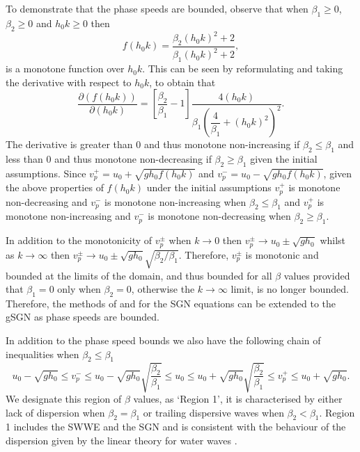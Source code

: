 \documentclass[10pt]{elsarticle}
\begin{document}
To demonstrate that the phase speeds are bounded, observe that when $\beta_1 \ge 0$, $\beta_2 \ge 0$ and $h_0 k \ge 0$ then
\begin{equation*}
f(h_0k) = \dfrac{\beta_2 \left(h_0 k\right)^2 + 2}{\beta_1 \left(h_0 k\right)^2 + 2},
\end{equation*}
is a monotone function over $h_0 k$. This can be seen by reformulating and taking the derivative with respect to $h_0 k$, to obtain that 
\begin{equation*}
 \dfrac{\partial \left(f(h_0k)\right)}{\partial \left(h_0 k\right)} = \left[\dfrac{\beta_2}{\beta_1} - 1\right] \dfrac{4\left(h_0 k\right)}{\beta_1\left( \dfrac{4}{\beta_1} + \left(h_0 k\right)^2\right)^2}.
\end{equation*}
The derivative is greater than $0$ and thus monotone non-increasing if $\beta_2 \le \beta_1$ and less than $0$ and thus monotone non-decreasing if $\beta_2 \ge  \beta_1$  given the initial assumptions. Since $v^+_p = u_0 + \sqrt{gh_0 f(h_0 k)} $ and $v^-_p = u_0 - \sqrt{gh_0 f(h_0 k)}$, given the above properties of $f(h_0k)$ under the initial assumptions $v^+_p$ is monotone non-decreasing and $v^-_p$ is monotone non-increasing when $\beta_2 \le  \beta_1$ and $v^+_p$ is monotone non-increasing and $v^-_p$ is monotone non-decreasing when $\beta_2 \ge  \beta_1$. 

In addition to the monotonicity of $v^\pm_p$ when $k \rightarrow 0$ then $v^\pm_p \rightarrow u_0 \pm \sqrt{gh_0}$ whilst as $k \rightarrow \infty$ then $v^\pm_p \rightarrow u_0 \pm \sqrt{gh_0} \sqrt{{\beta_2}/ \beta_1 }$. Therefore, $v^\pm_p$ is monotonic and bounded at the limits of the domain, and thus bounded for all $\beta$ values provided that $\beta_1 = 0$ only when $\beta_2 = 0$, otherwise the $k \rightarrow \infty$ limit, is no longer bounded. Therefore, the methods of \citet{Hank-etal-2010-2034} and \citet{Zoppou-etal-2017} for the SGN equations can be extended to the gSGN as phase speeds are bounded.

In addition to the phase speed bounds we also have the following chain of inequalities when ${\beta_2} \le \beta_1$ 
\begin{equation}
u_0 -  \sqrt{gh_0} \le  v^-_p \le u_0 - \sqrt{gh_0} \sqrt{\dfrac{\beta_2}{ \beta_1}} \le u_0 \le u_0 + \sqrt{gh_0} \sqrt{\dfrac{\beta_2}{\beta_1}} \le   v^+_p  \le u_0 +   \sqrt{gh_0}.
\label{eq:wavespeedbound1}
\end{equation}
We designate this region of $\beta$ values, as `Region 1', it is characterised by either lack of dispersion when $\beta_2 =  \beta_1$ or trailing dispersive waves when $\beta_2 <  \beta_1$. Region 1 includes the SWWE and the SGN and is consistent with the behaviour of the dispersion given by the linear theory for water waves \cite{Whitham-1967-399}. 
\end{document}
